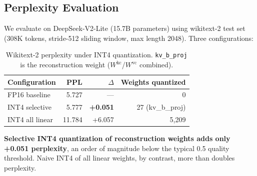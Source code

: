 \documentclass[10pt,twocolumn]{article}
\begin{document}
\subsection{Perplexity Evaluation}

We evaluate on DeepSeek-V2-Lite (15.7B parameters) using wikitext-2 test set (308K tokens, stride-512 sliding window, max length 2048).  Three configurations:

\begin{table}[h]
\centering
\small
\caption{Wikitext-2 perplexity under INT4 quantization.  \texttt{kv\_b\_proj} is the reconstruction weight ($W^\text{kc}$/$W^\text{vc}$ combined).}
\label{tab:ppl}
\begin{tabular}{@{}lrrr@{}}
\toprule
Configuration & PPL & $\Delta$ & Weights quantized \\
\midrule
FP16 baseline       & 5.727 & ---    & 0 \\
INT4 selective       & 5.777 & \textbf{+0.051} & 27 (kv\_b\_proj) \\
INT4 all linear      & 11.784 & +6.057 & 5,209 \\
\bottomrule
\end{tabular}
\end{table}

\textbf{Selective INT4 quantization of reconstruction weights adds only +0.051 perplexity}, an order of magnitude below the typical 0.5 quality threshold.  Naive INT4 of all linear weights, by contrast, more than doubles perplexity.
\end{document}
